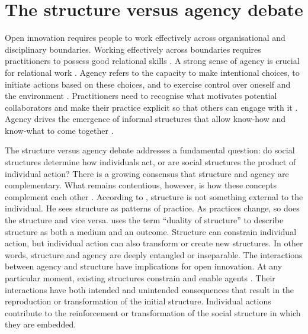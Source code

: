 \section{The structure versus agency debate}

Open innovation requires people to work effectively across organisational and disciplinary boundaries. Working effectively across boundaries requires practitioners to possess good relational skills \citep{chesbrough2012open}. A strong sense of agency is crucial for relational work \citep{edwards2017working}. Agency refers to the capacity to make intentional choices, to initiate actions based on these choices, and to exercise control over oneself and the environment \citep{goller2017human}. Practitioners need to recognise what motivates potential collaborators and make their practice explicit so that others can engage with it \citep{edwards2017working}. Agency drives the emergence of informal structures that allow know-how and know-what to come together \citep{lam2014tacit, hubrich2015embodiment}. \medskip

The structure versus agency debate addresses a fundamental question: do social structures determine how individuals act, or are social structures the product of individual action? There is a growing consensus that structure and agency are complementary. What remains contentious, however, is how these concepts complement each other \citep{tan2011understanding}. According to \citet{giddens1984constitution}, structure is not something external to the individual. He sees structure as patterns of practice. As practices change, so does the structure and vice versa. \citet{giddens1984constitution} uses the term \enquote{duality of structure} to describe structure as both a medium and an outcome. Structure can constrain individual action, but individual action can also transform or create new structures. In other words, structure and agency are deeply entangled or inseparable. The interactions between agency and structure have implications for open innovation. At any particular moment, existing structures constrain and enable agents \citep{emirbayer1998agency}. Their interactions have both intended and unintended consequences that result in the reproduction or transformation of the initial structure. Individual actions contribute to the reinforcement or transformation of the social structure in which they are embedded. \medskip

